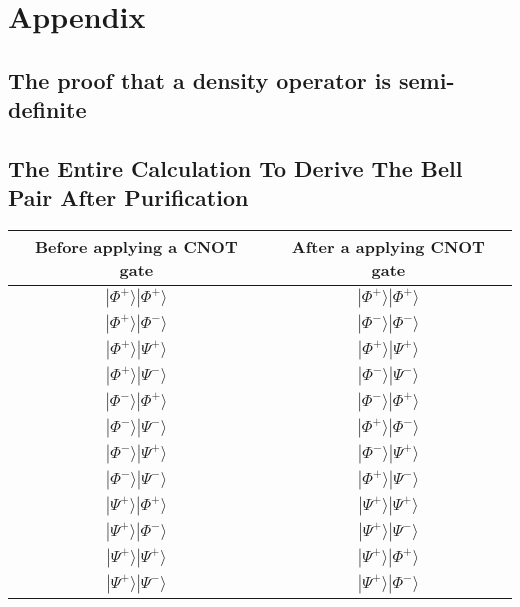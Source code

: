 \appendix
\chapter{Appendix}

\section{The proof that a density operator is semi-definite}


\section{The Entire Calculation To Derive The Bell Pair After Purification}
\label{appendix:purification}

\begin{table}[ht]
  \begin{center}
    \begin{tabular}{|c|c|} \hline
      Before applying a CNOT gate & After a applying CNOT gate \\ \hline \cline{1-2}
      $|\Phi^+\rangle|\Phi^+\rangle$ &  $|\Phi^+\rangle|\Phi^+\rangle$ \\ \cline{1-2}
      $|\Phi^+\rangle|\Phi^-\rangle$ &  $|\Phi^-\rangle|\Phi^-\rangle$ \\ \cline{1-2}
      $|\Phi^+\rangle|\Psi^+\rangle$ &  $|\Phi^+\rangle|\Psi^+\rangle$ \\ \cline{1-2}
      $|\Phi^+\rangle|\Psi^-\rangle$ &  $|\Phi^-\rangle|\Psi^-\rangle$ \\ \cline{1-2}
      $|\Phi^-\rangle|\Phi^+\rangle$ &  $|\Phi^-\rangle|\Phi^+\rangle$ \\ \cline{1-2}
      $|\Phi^-\rangle|\Psi^-\rangle$ &  $|\Phi^+\rangle|\Phi^-\rangle$ \\ \cline{1-2}
      $|\Phi^-\rangle|\Psi^+\rangle$ &  $|\Phi^-\rangle|\Psi^+\rangle$ \\ \cline{1-2}
      $|\Phi^-\rangle|\Psi^-\rangle$ &  $|\Phi^+\rangle|\Psi^-\rangle$ \\ \cline{1-2}
      $|\Psi^+\rangle|\Phi^+\rangle$ &  $|\Psi^+\rangle|\Psi^+\rangle$ \\ \cline{1-2}
      $|\Psi^+\rangle|\Phi^-\rangle$ &  $|\Psi^+\rangle|\Psi^-\rangle$ \\ \cline{1-2}
      $|\Psi^+\rangle|\Psi^+\rangle$ &  $|\Psi^+\rangle|\Phi^+\rangle$ \\ \cline{1-2}
      $|\Psi^+\rangle|\Psi^-\rangle$ &  $|\Psi^+\rangle|\Phi^-\rangle$ \\ \cline{1-2}

\end{tabular}
\end{center}
\end{table}
